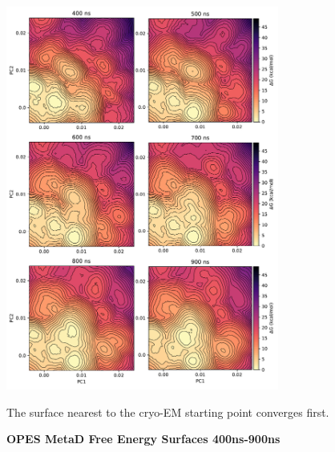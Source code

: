 \begin{figure}
	\begin{center}
		\includegraphics[width=0.8\textwidth]{figures/opening/convergence_1.pdf}
	\end{center}
	\captionsetup{singlelinecheck = false, justification=raggedright}
	\caption[OPES MetaD Free Energy Surfaces 400ns-900ns] {\textbf{OPES MetaD Free Energy Surfaces 400ns-900ns}}{The surface nearest to the cryo-EM starting point converges first.} 
	\label{convergence_opes_1}
\end{figure}

